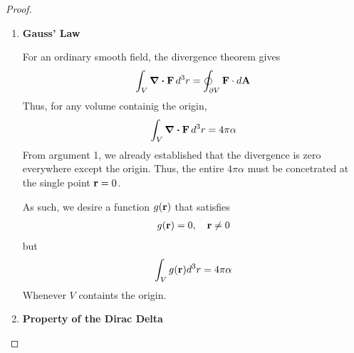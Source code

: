 \begin{proof}
\begin{enumerate}
					Suppose a sphere $S_R$ of radius $R$ centered at the origin. Since
					\begin{equation}
						\vb{F} = \frac{\alpha}{R^2}\vu{r} 
					\end{equation}
					on the sphere, and 
					\begin{equation}
						d\vb{A} = \vu{r} R^2 \sin\theta\dd{\theta}\dd{\phi},
					\end{equation}
					the flux is
					\begin{equation}
						\oint_{S_R}\vb{F}\cdot\dd{\vb{A}} 
							= \int_0^{2\pi} \int_0^\pi 
							  \frac{\alpha}{R^2} R^2  
							  \sin\theta\dd{\theta}\dd{\phi},
					\end{equation}
					Evaluating this, we have
					\begin{equation}
						\oint_{S_R} \vb{F}\cdot\dd{\vb{A}} = \alpha \cdot (4\pi)
					\end{equation}
					Therefore,
					\begin{equation}
						\oint_{S_R} \vb{F}\cdot\dd{\vb{A}} = 4\pi\alpha 
					\end{equation}
					Note that this is independent of $R$.
				\item \textbf{Gauss' Law}

					For an ordinary smooth field, the divergence theorem gives
					\begin{equation}
						\int_V \div\vb{F}\dd[3]{r} = \oint_{\partial V}\vb{F}\cdot d\vb{A}
					\end{equation}
					Thus, for any volume containig the origin,
					\begin{equation}
						\int_V \div\vb{F}\dd[3]{r} = 4\pi \alpha 
					\end{equation}
					From argument 1, we already established that the divergence 
					is zero everywhere except the origin. Thus, the entire $4\pi\alpha$
					must be concetrated at the single point $\vb{r}=0$.

					As such, we desire a function $g(\vb{r})$ that satisfies
					\begin{align}
						g(\vb{r}) =0,\quad \vb{r}\neq 0
					\end{align}
					but 
					\begin{equation}
						\int_V g(\vb{r})\dd[3]r = 4\pi\alpha
					\end{equation} 
					Whenever $V$ containts the origin.
				\item \textbf{Property of the Dirac Delta}


\end{enumerate}
\end{proof}
